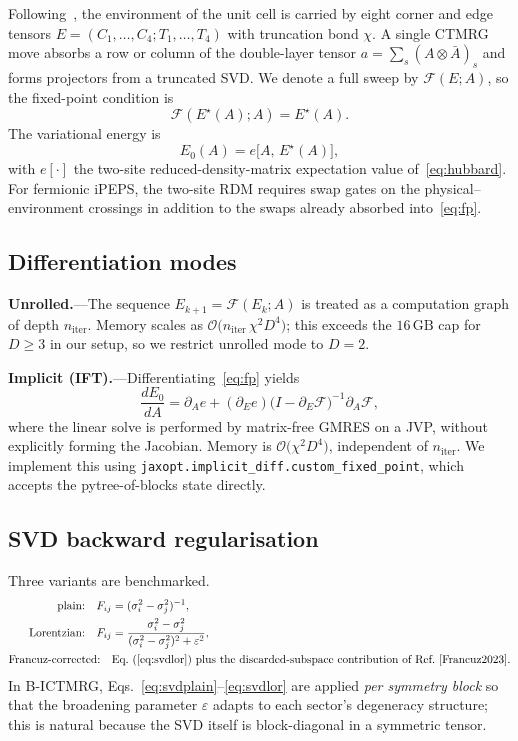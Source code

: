 \documentclass[aps,prb,reprint,amsmath,amssymb,floatfix]{revtex4-2}
\newcommand{\F}{\mathcal{F}}
\begin{document}
Following~\cite{OrusVidal2009}, the environment of the unit cell is carried by eight corner and edge tensors $E = (C_1,\dots,C_4;T_1,\dots,T_4)$ with truncation bond $\chi$. A single CTMRG move absorbs a row or column of the double-layer tensor $a = \sum_s (A\otimes \bar A)_s$ and forms projectors from a truncated SVD. We denote a full sweep by $\F(E;A)$, so the fixed-point condition is
\begin{equation}
\label{eq:fp}
\F(E^\star(A);A) = E^\star(A).
\end{equation}
The variational energy is
\begin{equation}
\label{eq:en}
E_0(A) = e\bigl[A,\,E^\star(A)\bigr],
\end{equation}
with $e[\cdot]$ the two-site reduced-density-matrix expectation value of~\eqref{eq:hubbard}. For fermionic iPEPS, the two-site RDM requires swap gates on the physical--environment crossings in addition to the swaps already absorbed into~\eqref{eq:fp}.

\subsection{Differentiation modes}

\textbf{Unrolled.}---The sequence $E_{k+1} = \F(E_k;A)$ is treated as a computation graph of depth $n_\text{iter}$. Memory scales as $\mathcal{O}\!\bigl(n_\text{iter}\,\chi^2 D^4\bigr)$; this exceeds the $16\,\mathrm{GB}$ cap for $D\geq 3$ in our setup, so we restrict unrolled mode to $D=2$.

\textbf{Implicit (IFT).}---Differentiating~\eqref{eq:fp} yields
\begin{equation}
\label{eq:ift}
\frac{dE_0}{dA} = \partial_A e + (\partial_E e)\bigl(I-\partial_E\F\bigr)^{-1}\partial_A\F,
\end{equation}
where the linear solve is performed by matrix-free GMRES on a JVP, without explicitly forming the Jacobian. Memory is $\mathcal{O}\!\bigl(\chi^2 D^4\bigr)$, independent of $n_\text{iter}$. We implement this using \texttt{jaxopt.implicit\_diff.custom\_fixed\_point}, which accepts the pytree-of-blocks state directly.

\subsection{SVD backward regularisation}

Three variants are benchmarked.
\begin{align}
\text{plain:}\quad F_{ij} &= (\sigma_i^2-\sigma_j^2)^{-1}, \label{eq:svdplain}\\
\text{Lorentzian:}\quad F_{ij} &= \frac{\sigma_i^2-\sigma_j^2}{(\sigma_i^2-\sigma_j^2)^2 + \varepsilon^2}, \label{eq:svdlor}\\
\text{Francuz-corrected:}\quad &\text{Eq.~(\ref{eq:svdlor}) plus the discarded-subspace contribution of Ref.~\cite{Francuz2023}.} \notag
\end{align}
In B-ICTMRG, Eqs.~\eqref{eq:svdplain}--\eqref{eq:svdlor} are applied \emph{per symmetry block} so that the broadening parameter $\varepsilon$ adapts to each sector's degeneracy structure; this is natural because the SVD itself is block-diagonal in a symmetric tensor.
\end{document}
